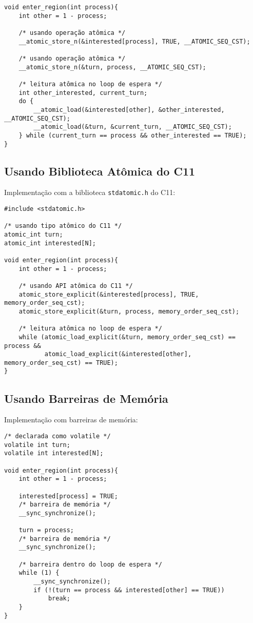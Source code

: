 \documentclass[12pt]{article}
\begin{document}
\begin{lstlisting}
void enter_region(int process){
    int other = 1 - process;

    /* usando operação atômica */
    __atomic_store_n(&interested[process], TRUE, __ATOMIC_SEQ_CST);

    /* usando operação atômica */
    __atomic_store_n(&turn, process, __ATOMIC_SEQ_CST);

    /* leitura atômica no loop de espera */
    int other_interested, current_turn;
    do {
        __atomic_load(&interested[other], &other_interested, __ATOMIC_SEQ_CST);
        __atomic_load(&turn, &current_turn, __ATOMIC_SEQ_CST);
    } while (current_turn == process && other_interested == TRUE);
}
\end{lstlisting}

\subsection{Usando Biblioteca Atômica do C11}

Implementação com a biblioteca \texttt{stdatomic.h} do C11:

\begin{lstlisting}
#include <stdatomic.h>

/* usando tipo atômico do C11 */
atomic_int turn;
atomic_int interested[N];

void enter_region(int process){
    int other = 1 - process;

    /* usando API atômica do C11 */
    atomic_store_explicit(&interested[process], TRUE, memory_order_seq_cst);
    atomic_store_explicit(&turn, process, memory_order_seq_cst);

    /* leitura atômica no loop de espera */
    while (atomic_load_explicit(&turn, memory_order_seq_cst) == process &&
           atomic_load_explicit(&interested[other], memory_order_seq_cst) == TRUE);
}
\end{lstlisting}

\subsection{Usando Barreiras de Memória}

Implementação com barreiras de memória:

\begin{lstlisting}
/* declarada como volatile */
volatile int turn;
volatile int interested[N];

void enter_region(int process){
    int other = 1 - process;

    interested[process] = TRUE;
    /* barreira de memória */
    __sync_synchronize();

    turn = process;
    /* barreira de memória */
    __sync_synchronize();

    /* barreira dentro do loop de espera */
    while (1) {
        __sync_synchronize();
        if (!(turn == process && interested[other] == TRUE))
            break;
    }
}
\end{lstlisting}
\end{document}
